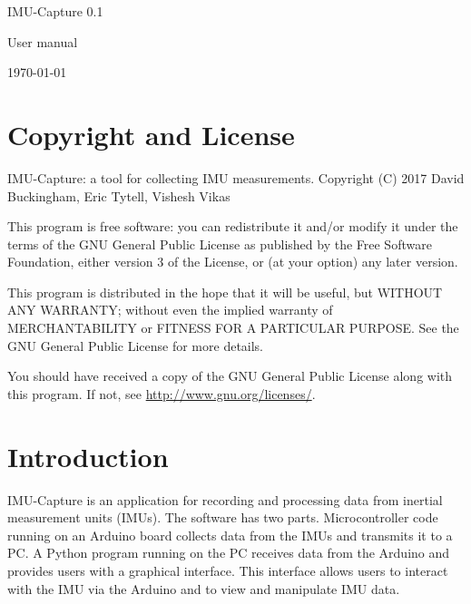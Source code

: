 \documentclass[11pt,letterpaper,article,oneside]{memoir}
\newcommand{\name}{IMU-Capture}
\newcommand{\programVersion}{0.1}
\begin{document}
\thispagestyle{empty}

{%
\centering
\Large

\vspace*{\fill}

{\huge
\name{} \programVersion{}
}

{\LARGE
User manual
}

\today

\vspace*{\fill}

}

\cleardoublepage

\tableofcontents*

\clearpage




\chapter{Copyright and License}

\name{}: a tool for collecting IMU measurements.
Copyright (C) 2017 David Buckingham, Eric Tytell, Vishesh Vikas

This program is free software: you can redistribute it and/or modify
it under the terms of the GNU General Public License as published by
the Free Software Foundation, either version 3 of the License, or
(at your option) any later version.

This program is distributed in the hope that it will be useful,
but WITHOUT ANY WARRANTY; without even the implied warranty of
MERCHANTABILITY or FITNESS FOR A PARTICULAR PURPOSE.  See the
GNU General Public License for more details.

You should have received a copy of the GNU General Public License
along with this program.  If not, see \url{http://www.gnu.org/licenses/}.




\chapter{Introduction}

\name{} is an application for recording and processing data from inertial
measurement units (IMUs). The software has two parts. Microcontroller code
running on an Arduino board collects data from the IMUs and transmits it to a
PC. A Python program running on the PC receives data from the Arduino and
provides users with a graphical interface. This interface allows users to
interact with the IMU via the Arduino and to view and manipulate IMU data.
\end{document}
